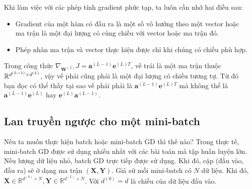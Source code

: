 Khi làm việc với các phép tính gradient phức tạp, ta luôn cần nhớ hai điều sau:
\begin{itemize}
\item Gradient của một hàm có đầu ra là một số vô hướng theo một vector hoặc
ma trận là một đại lượng có cùng chiều với vector hoặc ma trận đó.

\item Phép nhân ma trận và vector thực hiện được chỉ khi chúng có chiều phù hợp.
\end{itemize}

Trong công thức $ \nabla_{\mathbf{W}^{(L)}}J =
\mathbf{a}^{(L-1)}\mathbf{e}^{(L)T}$, vế trái là một ma trận thuộc
$\mathbb{R}^{d^{(L-1)}\times d^{(L)}}$, vậy vế phải cũng phải là một đại lượng có chiều
tương tự. Từ đó bạn đọc có thể thấy tại sao vế phải phải là
$\mathbf{a}^{(L-1)}\mathbf{e}^{(L)T}$ mà không thể là
$\mathbf{a}^{(L-1)}\mathbf{e}^{(L)}$ hay $\mathbf{e}^{(L)}\mathbf{a}^{(L-1)}$.





\subsection{Lan truyền ngược cho một mini-batch}

Nếu ta muốn thực hiện batch hoặc mini-batch GD thì thế nào? Trong thực tế,
mini-batch GD được sử dụng nhiều nhất với các bài toán mà tập huấn luyện lớn.
Nếu lượng dữ liệu nhỏ, batch GD trực tiếp được sử dụng. Khi đó, cặp (đầu vào,
đầu ra) sẽ ở dạng ma trận $(\mathbf{X, Y})$. Giả sử
mỗi mini-batch có $N$ dữ liệu. Khi đó, $\mathbf{X} \in \mathbb{R}^{d^{(0)} \times N}, \mathbf{Y} \in \mathbb{R}^{d^{(L)}\times N}$. Với $d^{(0)} = d$ là chiều của dữ liệu đầu vào.

